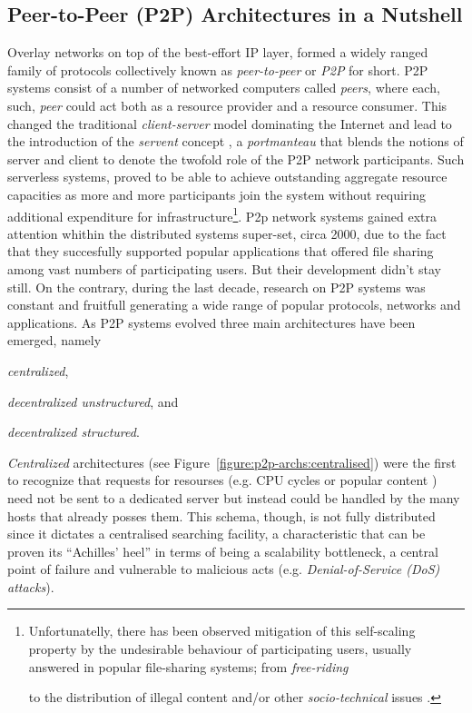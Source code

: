 \subsection{Peer-to-Peer (P2P) Architectures in a Nutshell}
Overlay networks on top of the best-effort IP layer, formed a widely ranged
family of protocols collectively known as \emph{peer-to-peer} or \emph{P2P} for
short. P2P systems consist of a number of networked computers called
\emph{peers}, where each, such, \emph{peer} could act both as a resource
provider and a resource consumer. This changed the traditional
\emph{client-server} model dominating the Internet and lead to the introduction
of the \emph{servent} concept \cite{gnutella}, a \emph{portmanteau} that blends
the notions of server and client to denote the twofold role of the P2P network
participants. Such serverless systems, proved to be able to achieve outstanding
aggregate resource capacities as more and more participants join the system
without requiring additional expenditure for infrastructure\footnote{
  Unfortunatelly, there has been observed mitigation of this self-scaling
  property by the undesirable behaviour of participating users, usually answered
  in popular file-sharing systems; from \emph{free-riding}

\cite{saroiu_measurefileshare_2002,adar_gnutellafreeriders_2000,hughes_gnutellafreeride_2005}
to the distribution of illegal content and/or other \emph{socio-technical}
issues \cite{hughes_socp2p_2008}.
}.
P2p network systems gained extra attention whithin the distributed systems
super-set, circa 2000, due to the fact that they succesfully supported popular
applications that offered file sharing among vast numbers of participating
users. But their development didn't stay still. On the contrary, during the last
decade, research on P2P systems was constant and fruitfull generating a wide
range of popular protocols, networks and applications. As P2P systems evolved
three main architectures have been emerged, namely
\begin{inparaenum}
  \item \emph{centralized},
  \item \emph{decentralized unstructured}, and
  \item \emph{decentralized structured}.
\end{inparaenum}

\emph{Centralized} architectures (see Figure~\ref{figure:p2p-archs:centralised})
were the first to recognize that requests for resourses (e.g. CPU cycles
\cite{seti} or popular content
\cite{}) need not be sent to a dedicated server but instead could be handled by
the many hosts that already posses them. This schema, though, is not fully
distributed since it dictates a centralised searching facility, a characteristic
that can be proven its ``Achilles' heel'' in terms of being a scalability
bottleneck, a central point of failure and vulnerable to malicious acts (e.g.
\emph{Denial-of-Service (DoS) attacks}).

